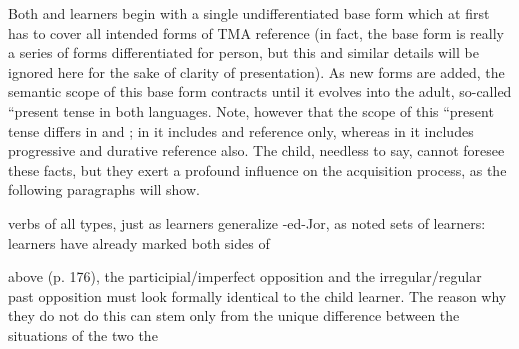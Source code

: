 Both  and  learners begin with a single undifferentiated base form which at first has to cover all intended forms of TMA reference (in fact, the  base form is really a series of forms differentiated for person, but this and similar details will be ignored here for the sake of clarity of presentation). As new forms are added, the semantic scope of this base form contracts until it evolves into the adult, so-called ``present tense in both languages. Note, however that the scope of this ``present tense differs in  and ; in  it includes  and  reference only, whereas in  it includes progressive and durative reference also. The child, needless to say, cannot foresee these facts, but they exert a profound influence on the acquisition process, as the following paragraphs will show.

verbs of all types, just as  learners generalize -ed-Jor, as noted
sets of learners:  learners have already marked both sides of

above (p. 176), the  participial/imperfect opposition and the
 irregular/regular past opposition must look formally identical to the child learner. The reason why they do not do this can stem only from the unique difference between the situations of the two the


